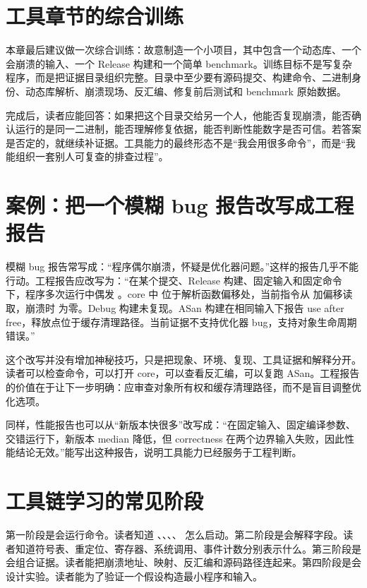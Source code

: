 \section{工具章节的综合训练}

本章最后建议做一次综合训练：故意制造一个小项目，其中包含一个动态库、一个会崩溃的输入、一个 Release 构建和一个简单 benchmark。训练目标不是写复杂程序，而是把证据目录组织完整。目录中至少要有源码提交、构建命令、二进制身份、动态库解析、崩溃现场、反汇编、修复前后测试和 benchmark 原始数据。

完成后，读者应能回答：如果把这个目录交给另一个人，他能否复现崩溃，能否确认运行的是同一二进制，能否理解修复依据，能否判断性能数字是否可信。若答案是否定的，就继续补证据。工具能力的最终形态不是“我会用很多命令”，而是“我能组织一套别人可复查的排查过程”。

\section{案例：把一个模糊 bug 报告改写成工程报告}

模糊 bug 报告常写成：“程序偶尔崩溃，怀疑是优化器问题。”这样的报告几乎不能行动。工程报告应改写为：“在某个提交、Release 构建、固定输入和固定命令下，程序多次运行中偶发 。core 中  位于解析函数偏移处，当前指令从  加偏移读取，崩溃时  为零。Debug 构建未复现。ASan 构建在相同输入下报告 use after free，释放点位于缓存清理路径。当前证据不支持优化器 bug，支持对象生命周期错误。”

这个改写并没有增加神秘技巧，只是把现象、环境、复现、工具证据和解释分开。读者可以检查命令，可以打开 core，可以查看反汇编，可以复跑 ASan。工程报告的价值在于让下一步明确：应审查对象所有权和缓存清理路径，而不是盲目调整优化选项。

同样，性能报告也可以从“新版本快很多”改写成：“在固定输入、固定编译参数、交错运行下，新版本 median 降低，但 correctness 在两个边界输入失败，因此性能结论无效。”能写出这种报告，说明工具能力已经服务于工程判断。

\section{工具链学习的常见阶段}

第一阶段是会运行命令。读者知道 、、、、 怎么启动。第二阶段是会解释字段。读者知道符号表、重定位、寄存器、系统调用、事件计数分别表示什么。第三阶段是会组合证据。读者能把崩溃地址、映射、反汇编和源码路径连起来。第四阶段是会设计实验。读者能为了验证一个假设构造最小程序和输入。

